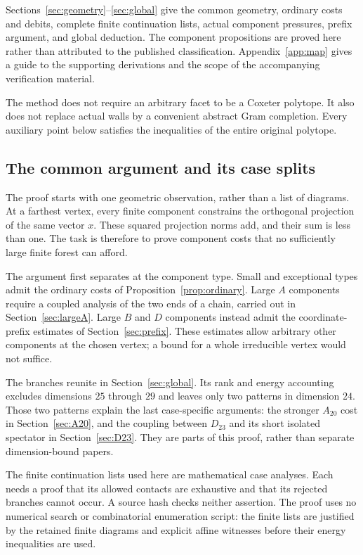 \documentclass[11pt]{article}
\theoremstyle{remark}
\begin{document}
Sections~\ref{sec:geometry}--\ref{sec:global} give the common geometry,
ordinary costs and debits, complete finite continuation lists, actual
component pressures, prefix argument, and global deduction.
The component propositions are proved here rather than attributed to
the published classification. Appendix~\ref{app:map} gives a guide to
the supporting derivations and the scope of the accompanying
verification material.

The method does not require an arbitrary facet to be a Coxeter
polytope. It also does not replace actual walls by a convenient
abstract Gram completion. Every auxiliary point below satisfies the
inequalities of the entire original polytope.

\subsection{The common argument and its case splits}

The proof starts with one geometric observation, rather than a list
of diagrams. At a farthest vertex, every finite component constrains
the orthogonal projection of the same vector $x$. These squared
projection norms add, and their sum is less than one. The task is
therefore to prove component costs that no sufficiently large
finite forest can afford.

The argument first separates at the component type. Small and
exceptional types admit the ordinary costs of
Proposition~\ref{prop:ordinary}. Large $A$ components require a
coupled analysis of the two ends of a chain, carried out in
Section~\ref{sec:largeA}. Large $B$ and $D$ components instead
admit the coordinate-prefix estimates of Section~\ref{sec:prefix}.
These estimates allow arbitrary other components at the chosen
vertex; a bound for a whole irreducible vertex would not suffice.

The branches reunite in Section~\ref{sec:global}. Its rank and
energy accounting excludes dimensions $25$ through $29$ and leaves
only two patterns in dimension $24$. Those two patterns explain the
last case-specific arguments: the stronger $A_{20}$ cost in
Section~\ref{sec:A20}, and the coupling between $D_{23}$ and its
short isolated spectator in Section~\ref{sec:D23}. They are parts
of this proof, rather than separate dimension-bound papers.

The finite continuation lists used here are mathematical case
analyses. Each needs a proof that its allowed contacts are exhaustive
and that its rejected branches cannot occur. A source hash checks
neither assertion. The proof uses no numerical search or combinatorial
enumeration script: the finite lists are justified by the retained finite diagrams and
explicit affine witnesses before their energy inequalities are used.
\end{document}

